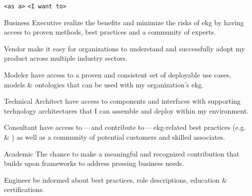 \begin{basedescript}{%
    \desclabelstyle{\multilinelabel}
    \desclabelwidth{2cm}
}
    \item[\texttt{<as a>}]      \texttt{<I want to>}
    \item[Business Executive]   realize the benefits and minimize the risks of \gls{ekg} by having access to
                                proven methods, best practices and a community of experts.
    \item[Vendor]               make it easy for organizations to understand and successfully adopt my product across
                                multiple industry sectors.
    \item[Modeler]              have access to a proven and consistent set of deployable use cases,
                                models \& ontologies that can be used with my organization’s \gls{ekg}.
    \item[Technical Architect]  have access to components and interfaces with supporting technology architectures
                                that I can assemble and deploy within my environment.
    \item[Consultant]           have access to\,---\,and contribute to\,---\,\gls{ekg}-related best practices
                                (e.g.  \& ) as well as a community of
                                potential customers and skilled associates.
    \item[Academic]             The chance to make a meaningful and recognized contribution that builds upon
                                frameworks to address pressing business needs.
    \item[\glsxtrshort{ekg} Engineer] be informed about best practices, role descriptions, education
                                \& certifications.
\end{basedescript}